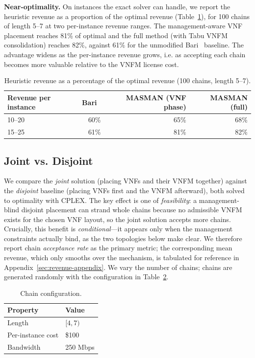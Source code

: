 \textbf{Near-optimality.} On instances the exact solver can handle, we report the
heuristic revenue as a proportion of the optimal revenue
(Table~\ref{tbl:near-optimal}), for 100 chains of length 5--7 at two per-instance
revenue ranges. The management-aware VNF placement reaches 81\% of optimal and the
full method (with Tabu VNFM consolidation) reaches 82\%, against 61\% for the
unmodified Bari~\cite{Bari2015} baseline. The advantage widens as the per-instance
revenue grows, i.e. as accepting each chain becomes more valuable relative to the
VNFM license cost.

\begin{table}[H]
\caption{Heuristic revenue as a percentage of the optimal revenue (100 chains,
length 5--7).}
\label{tbl:near-optimal}
\begin{tabularx}{\textwidth}{Xrrr}
\toprule
\textbf{Revenue per instance} & \textbf{Bari~\cite{Bari2015}} & \textbf{MASMAN (VNF phase)} & \textbf{MASMAN (full)} \\
\midrule
10--20 & 60\% & 65\% & 68\% \\
15--25 & 61\% & 81\% & 82\% \\
\bottomrule
\end{tabularx}
\end{table}

\subsection{Joint vs. Disjoint}\label{sec:joint-vs-disjoint}

We compare the \emph{joint} solution (placing VNFs and their VNFM together)
against the \emph{disjoint} baseline (placing VNFs first and the VNFM afterward),
both solved to optimality with CPLEX. The key effect is one of \emph{feasibility}:
a management-blind disjoint placement can strand whole chains because no
admissible VNFM exists for the chosen VNF layout, so the joint solution accepts
more chains. Crucially, this benefit is \emph{conditional}---it appears only when
the management constraints actually bind, as the two topologies below make clear.
We therefore report chain \emph{acceptance rate} as the primary metric; the
corresponding mean revenue, which only smooths over the mechanism, is tabulated
for reference in Appendix~\ref{sec:revenue-appendix}. We vary the number of
chains; chains are generated randomly with the configuration in
Table~\ref{tbl:chain-config}.

\begin{table}[H]
\caption{Chain configuration.}
\label{tbl:chain-config}
\begin{tabularx}{0.6\textwidth}{lX}
\toprule
\textbf{Property} & \textbf{Value} \\
\midrule
Length & \([4, 7)\) \\
Per-instance cost & \$100 \\
Bandwidth & 250 Mbps \\
\bottomrule
\end{tabularx}
\end{table}

